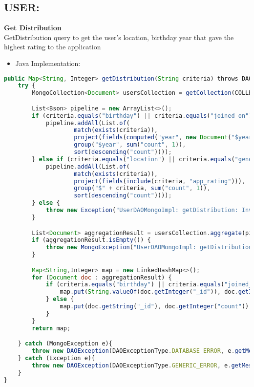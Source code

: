\subsection*{USER:}
\textbf{Get Distribution}\\
GetDistribution query to get the user's location, birthday year that gave the highest rating to the application
\begin{itemize}
    \item Java Implementation:
\end{itemize}
\begin{lstlisting}[language=JavaScript]
public Map<String, Integer> getDistribution(String criteria) throws DAOException {
    try {
        MongoCollection<Document> usersCollection = getCollection(COLLECTION_NAME);

        List<Bson> pipeline = new ArrayList<>();
        if (criteria.equals("birthday") || criteria.equals("joined_on")) {
            pipeline.addAll(List.of(
                    match(exists(criteria)),
                    project(fields(computed("year", new Document("$year", "$" + criteria)), include("app_rating" ))),
                    group("$year", sum("count", 1)),
                    sort(descending("count"))));
        } else if (criteria.equals("location") || criteria.equals("gender")) {
            pipeline.addAll(List.of(
                    match(exists(criteria)),
                    project(fields(include(criteria, "app_rating"))),
                    group("$" + criteria, sum("count", 1)),
                    sort(descending("count"))));
        } else {
            throw new Exception("UserDAOMongoImpl: getDistribution: Invalid criteria");
        }

        List<Document> aggregationResult = usersCollection.aggregate(pipeline).into(new ArrayList<>());
        if (aggregationResult.isEmpty()) {
            throw new MongoException("UserDAOMongoImpl: getDistribution: No data found");
        }

        Map<String,Integer> map = new LinkedHashMap<>();
        for (Document doc : aggregationResult) {
            if (criteria.equals("birthday") || criteria.equals("joined_on")) {
                map.put(String.valueOf(doc.getInteger("_id")), doc.getInteger("count"));
            } else {
                map.put(doc.getString("_id"), doc.getInteger("count"));
            }
        }
        return map;

    } catch (MongoException e){
        throw new DAOException(DAOExceptionType.DATABASE_ERROR, e.getMessage());
    } catch (Exception e){
        throw new DAOException(DAOExceptionType.GENERIC_ERROR, e.getMessage());
    }
}
\end{lstlisting}

